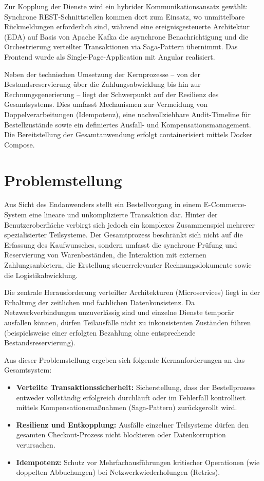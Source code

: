 \documentclass[
  11pt,
  a4paper,
  oneside,
  headings=normal,
  parskip=half,
  DIV=12
]{scrreprt}
\begin{document}
Zur Kopplung der Dienste wird ein hybrider Kommunikationsansatz gewählt: Synchrone REST-Schnittstellen kommen dort zum Einsatz, wo unmittelbare Rückmeldungen erforderlich sind, während eine ereignisgesteuerte Architektur (EDA) auf Basis von Apache Kafka die asynchrone Benachrichtigung und die Orchestrierung verteilter Transaktionen via Saga-Pattern übernimmt. Das Frontend wurde als Single-Page-Application mit Angular realisiert.

Neben der technischen Umsetzung der Kernprozesse – von der Bestandsreservierung über die Zahlungsabwicklung bis hin zur Rechnungsgenerierung – liegt der Schwerpunkt auf der Resilienz des Gesamtsystems. Dies umfasst Mechanismen zur Vermeidung von Doppelverarbeitungen (Idempotenz), eine nachvollziehbare Audit-Timeline für Bestellzustände sowie ein definiertes Ausfall- und Kompensationsmanagement. Die Bereitstellung der Gesamtanwendung erfolgt containerisiert mittels Docker Compose.

\chapter{Problemstellung}

Aus Sicht des Endanwenders stellt ein Bestellvorgang in einem E-Commerce-System eine lineare und unkomplizierte Transaktion dar. Hinter der Benutzeroberfläche verbirgt sich jedoch ein komplexes Zusammenspiel mehrerer spezialisierter Teilsysteme. Der Gesamtprozess beschränkt sich nicht auf die Erfassung des Kaufwunsches, sondern umfasst die synchrone Prüfung und Reservierung von Warenbeständen, die Interaktion mit externen Zahlungsanbietern, die Erstellung steuerrelevanter Rechnungsdokumente sowie die Logistikabwicklung.

Die zentrale Herausforderung verteilter Architekturen (Microservices) liegt in der Erhaltung der zeitlichen und fachlichen Datenkonsistenz. Da Netzwerkverbindungen unzuverlässig sind und einzelne Dienste temporär ausfallen können, dürfen Teilausfälle nicht zu inkonsistenten Zuständen führen (beispielsweise einer erfolgten Bezahlung ohne entsprechende Bestandsreservierung).

Aus dieser Problemstellung ergeben sich folgende Kernanforderungen an das Gesamtsystem:
\begin{itemize}
    \item \textbf{Verteilte Transaktionssicherheit:} Sicherstellung, dass der Bestellprozess entweder vollständig erfolgreich durchläuft oder im Fehlerfall kontrolliert mittels Kompensationsmaßnahmen (Saga-Pattern) zurückgerollt wird.
    \item \textbf{Resilienz und Entkopplung:} Ausfälle einzelner Teilsysteme dürfen den gesamten Checkout-Prozess nicht blockieren oder Datenkorruption verursachen.
    \item \textbf{Idempotenz:} Schutz vor Mehrfachausführungen kritischer Operationen (wie doppelten Abbuchungen) bei Netzwerkwiederholungen (Retries).
\end{itemize}
\end{document}
